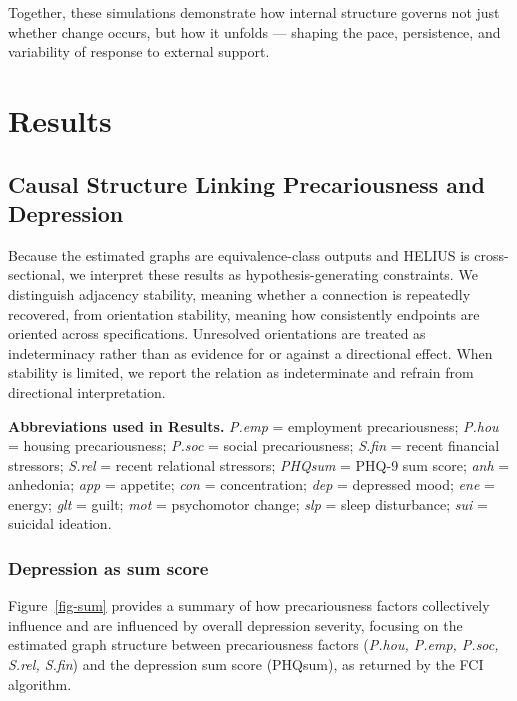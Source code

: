 \documentclass[
]{article}
\begin{document}
Together, these simulations demonstrate how internal structure governs
not just whether change occurs, but how it unfolds --- shaping the pace,
persistence, and variability of response to external support.

\section{Results}\label{results}

\subsection{Causal Structure Linking Precariousness and
Depression}\label{causal-structure-linking-precariousness-and-depression}

\textcolor{BrickRed}{Because the estimated graphs are equivalence-class outputs and HELIUS is cross-sectional, we interpret these results as hypothesis-generating constraints. We distinguish adjacency stability, meaning whether a connection is repeatedly recovered, from orientation stability, meaning how consistently endpoints are oriented across specifications. Unresolved orientations are treated as indeterminacy rather than as evidence for or against a directional effect. When stability is limited, we report the relation as indeterminate and refrain from directional interpretation.}

\begin{abbrbox}
\textbf{Abbreviations used in Results.}
\emph{P.emp} = employment precariousness; \emph{P.hou} = housing precariousness; \emph{P.soc} = social precariousness; \emph{S.fin} = recent financial stressors; \emph{S.rel} = recent relational stressors; \emph{PHQsum} = PHQ-9 sum score; \emph{anh} = anhedonia; \emph{app} = appetite; \emph{con} = concentration; \emph{dep} = depressed mood; \emph{ene} = energy; \emph{glt} = guilt; \emph{mot} = psychomotor change; \emph{slp} = sleep disturbance; \emph{sui} = suicidal ideation.
\end{abbrbox}

\subsubsection{Depression as sum score}\label{depression-as-sum-score}

Figure~\ref{fig-sum} provides a summary of how precariousness factors
collectively influence and are influenced by overall depression
severity,
\textcolor{BrickRed}{focusing on the estimated graph structure between precariousness factors (\textit{P.hou, P.emp, P.soc, S.rel, S.fin}) and the depression sum score (PHQsum), as returned by the FCI algorithm.}
\end{document}
